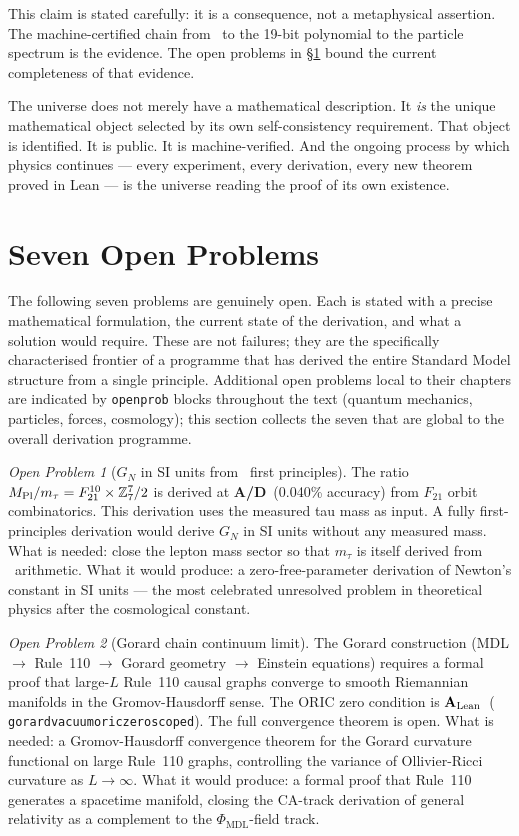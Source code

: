 \documentclass[11pt,openany]{book}
\theoremstyle{remark}
\newtheorem{openprob}{Open Problem}[chapter]
\newcommand{\GTE}{\text{GTE}}
\newcommand{\PSC}{\text{PSC}}
\newcommand{\PHIMDL}{\Phi_{\mathrm{MDL}}}
\newcommand{\ZS}{\mathbb{Z}_7}
\newcommand{\lean}[1]{%
  \penalty-100
  \begingroup\def\_{\textunderscore\allowbreak}\texttt{#1}\endgroup}
\newcommand{\CatAL}{\ensuremath{\textbf{A}_{\rm Lean}}}
\newcommand{\CatAD}{\textbf{A/D}}
\begin{document}
This claim is stated carefully: it is a consequence, not a metaphysical assertion.
The machine-certified chain from \PSC\ to the 19-bit polynomial to the particle
spectrum is the evidence. The open problems in \S\ref{sec:open} bound the
current completeness of that evidence.

The universe does not merely have a mathematical description. It \emph{is} the
unique mathematical object selected by its own self-consistency requirement. That
object is identified. It is public. It is machine-verified. And the ongoing
process by which physics continues --- every experiment, every derivation, every
new theorem proved in Lean --- is the universe reading the proof of its own existence.

\section{Seven Open Problems}
\label{sec:open}

The following seven problems are genuinely open. Each is stated with a precise
mathematical formulation, the current state of the derivation, and what a solution
would require. These are not failures; they are the specifically characterised
frontier of a programme that has derived the entire Standard Model structure from
a single principle.
Additional open problems local to their chapters are indicated by \texttt{openprob}
blocks throughout the text (quantum mechanics, particles, forces, cosmology); this
section collects the seven that are global to the overall derivation programme.

\begin{openprob}[$G_N$ in SI units from \GTE\ first principles]
The ratio $M_{\rm Pl}/m_\tau = F_{21}^{10} \times \ZS^7/2$ is derived at \CatAD\
(0.040\% accuracy) from $F_{21}$ orbit combinatorics. This derivation uses the
measured tau mass as input. A fully first-principles derivation would derive $G_N$
in SI units without any measured mass. What is needed: close the lepton mass sector
so that $m_\tau$ is itself derived from \GTE\ arithmetic. What it would produce:
a zero-free-parameter derivation of Newton's constant in SI units --- the most
celebrated unresolved problem in theoretical physics after the cosmological constant.
\end{openprob}

\begin{openprob}[Gorard chain continuum limit]
The Gorard construction (MDL $\to$ Rule~110 $\to$ Gorard geometry $\to$ Einstein
equations) requires a formal proof that large-$L$ Rule~110 causal graphs converge
to smooth Riemannian manifolds in the Gromov-Hausdorff sense. The ORIC zero condition
is \CatAL\ (\lean{gorard\_vacuum\_oric\_zero\_scoped}). The full convergence theorem
is open. What is needed: a Gromov-Hausdorff convergence theorem for the Gorard
curvature functional on large Rule~110 graphs, controlling the variance of Ollivier-Ricci
curvature as $L \to \infty$. What it would produce: a formal proof that Rule~110
generates a spacetime manifold, closing the CA-track derivation of general relativity
as a complement to the $\PHIMDL$-field track.
\end{openprob}
\end{document}
